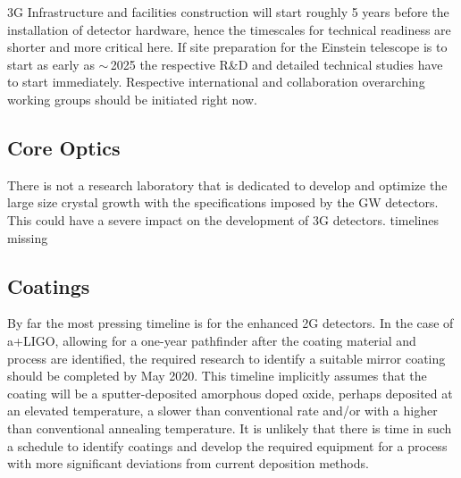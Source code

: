 3G Infrastructure and facilities construction will start roughly 5 years before the installation of detector hardware, hence the timescales for technical readiness are shorter and more critical here.
If site preparation for the Einstein telescope is to start as early as $\sim$\,2025 the respective R\&D and detailed technical studies have to start immediately. Respective international and collaboration overarching working groups should be initiated right now.

\subsection{Core Optics}
There is not a research laboratory that is dedicated to develop and optimize the large size crystal growth with the specifications imposed by the GW detectors. This could have a severe impact on the development of 3G detectors.
timelines missing
\subsection{Coatings}
By far the most pressing timeline is for the enhanced 2G detectors. In the case of a+LIGO, allowing for a one-year pathfinder after the coating material and process are identified, the required research to identify a suitable mirror coating should be completed by May 2020. This timeline implicitly assumes that the coating will be a sputter-deposited amorphous doped oxide, perhaps deposited at an elevated temperature, a slower than conventional rate and/or with a higher than conventional annealing temperature. It is unlikely that there is time in such a schedule to identify coatings and develop the required equipment for a process with more significant deviations from current deposition methods.

